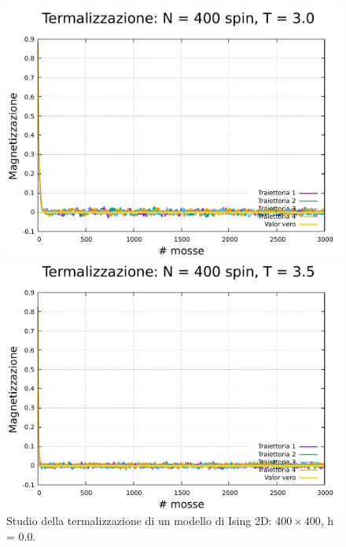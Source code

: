 \begin{figure}[H]
    \begin{minipage}{0.45\textwidth}  
      \centering
      \includegraphics[page=1, width=\textwidth]{Immagini/simIsing2D/metro/term/term_400_3.0.pdf}
      \caption{$T\,=\,3.0$}
    \end{minipage}\hfill
    \begin{minipage}{0.45\textwidth}  
      \centering
      \includegraphics[page=1, width=\textwidth]{Immagini/simIsing2D/metro/term/term_400_3.5.pdf}
      \caption{$T\,=\,3.5$}
    \end{minipage}
    \caption{Studio della termalizzazione di un modello di Ising 2D: $400 \times 400$, h = 0.0.}
\end{figure}

